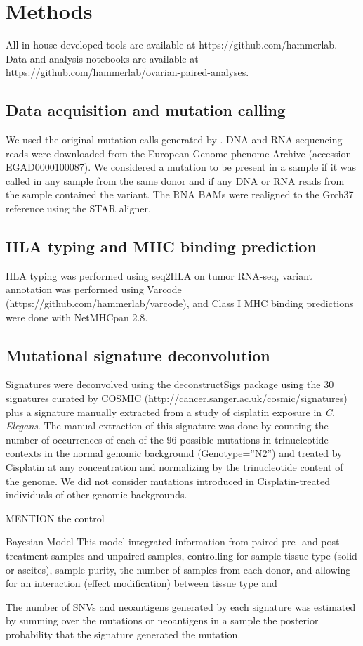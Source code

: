 \section*{Methods}
All in-house developed tools are available at https://github.com/hammerlab. Data and analysis notebooks are available at https://github.com/hammerlab/ovarian-paired-analyses.

\subsection*{Data acquisition and mutation calling}
We used the original mutation calls generated by \cite{Patch_2015}. DNA and RNA sequencing reads were downloaded from the European Genome-phenome Archive (accession EGAD0000100087). We considered a mutation to be present in a sample if it was called in any sample from the same donor and if any DNA or RNA reads from the sample contained the variant. The RNA BAMs were realigned to the Grch37 reference using the STAR aligner.

\subsection*{HLA typing and MHC binding prediction}
HLA typing was performed using seq2HLA\cite{Boegel_2012} on tumor RNA-seq, variant annotation was performed using Varcode (https://github.com/hammerlab/varcode), and Class I MHC binding predictions were done with NetMHCpan 2.8\cite{Lundegaard_2008}.

\subsection*{Mutational signature deconvolution}
Signatures were deconvolved using the deconstructSigs\cite{Rosenthal_2016} package using the 30 signatures curated by COSMIC (http://cancer.sanger.ac.uk/cosmic/signatures) plus a signature manually extracted from a study of cisplatin exposure in \textit{C. Elegans}\cite{Meier_2014}. The manual extraction of this signature was done by counting the number of occurrences of each of the 96 possible mutations in trinucleotide contexts in the normal genomic background (Genotype=”N2”) and treated by Cisplatin at any concentration and normalizing by the trinucleotide content of the  genome. We did not consider mutations introduced in Cisplatin-treated individuals of other genomic backgrounds.

MENTION the control

Bayesian Model
 This model integrated information from paired pre- and post-treatment samples and unpaired samples, controlling for sample tissue type (solid or ascites), sample purity, the number of samples from each donor, and allowing for an interaction (effect modification) between tissue type and 
 
 The number of SNVs and neoantigens generated by each signature was estimated by summing over the mutations or neoantigens in a sample the posterior probability that the signature generated the mutation.

